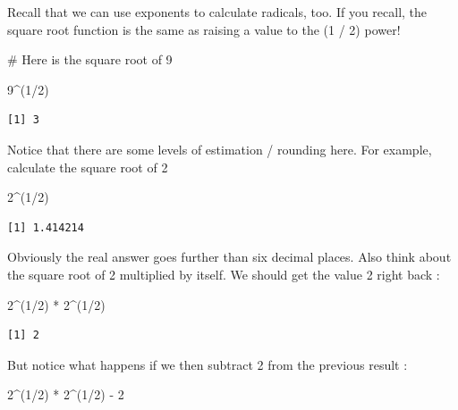 \documentclass[
  letterpaper,
  DIV=11,
  numbers=noendperiod]{scrreprt}
\newenvironment{Shaded}{\begin{snugshade}}{\end{snugshade}}
\newcommand{\CommentTok}[1]{\textcolor[rgb]{0.37,0.37,0.37}{#1}}
\newcommand{\DecValTok}[1]{\textcolor[rgb]{0.68,0.00,0.00}{#1}}
\newcommand{\NormalTok}[1]{\textcolor[rgb]{0.00,0.23,0.31}{#1}}
\newcommand{\SpecialCharTok}[1]{\textcolor[rgb]{0.37,0.37,0.37}{#1}}
\begin{document}
Recall that we can use exponents to calculate radicals, too. If you
recall, the square root function is the same as raising a value to the
(1 / 2) power!

\begin{Shaded}
\begin{Highlighting}[]
\CommentTok{\# Here is the square root of 9}

\DecValTok{9}\SpecialCharTok{\^{}}\NormalTok{(}\DecValTok{1}\SpecialCharTok{/}\DecValTok{2}\NormalTok{)}
\end{Highlighting}
\end{Shaded}

\begin{verbatim}
[1] 3
\end{verbatim}

Notice that there are some levels of estimation / rounding here. For
example, calculate the square root of 2

\begin{Shaded}
\begin{Highlighting}[]
\DecValTok{2}\SpecialCharTok{\^{}}\NormalTok{(}\DecValTok{1}\SpecialCharTok{/}\DecValTok{2}\NormalTok{)}
\end{Highlighting}
\end{Shaded}

\begin{verbatim}
[1] 1.414214
\end{verbatim}

Obviously the real answer goes further than six decimal places. Also
think about the square root of 2 multiplied by itself. We should get the
value 2 right back :

\begin{Shaded}
\begin{Highlighting}[]
\DecValTok{2}\SpecialCharTok{\^{}}\NormalTok{(}\DecValTok{1}\SpecialCharTok{/}\DecValTok{2}\NormalTok{) }\SpecialCharTok{*} \DecValTok{2}\SpecialCharTok{\^{}}\NormalTok{(}\DecValTok{1}\SpecialCharTok{/}\DecValTok{2}\NormalTok{)}
\end{Highlighting}
\end{Shaded}

\begin{verbatim}
[1] 2
\end{verbatim}

But notice what happens if we then subtract 2 from the previous result :

\begin{Shaded}
\begin{Highlighting}[]
\DecValTok{2}\SpecialCharTok{\^{}}\NormalTok{(}\DecValTok{1}\SpecialCharTok{/}\DecValTok{2}\NormalTok{) }\SpecialCharTok{*} \DecValTok{2}\SpecialCharTok{\^{}}\NormalTok{(}\DecValTok{1}\SpecialCharTok{/}\DecValTok{2}\NormalTok{) }\SpecialCharTok{{-}} \DecValTok{2}
\end{Highlighting}
\end{Shaded}
\end{document}
